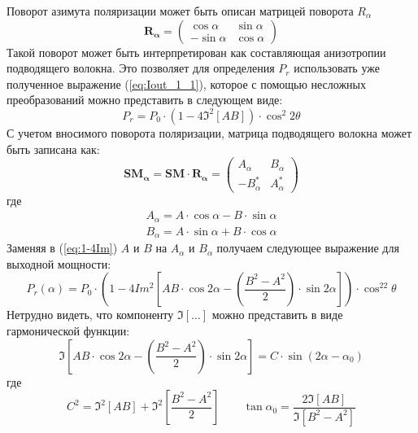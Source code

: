 \documentclass{article}
\begin{document}
Поворот азимута поляризации может быть описан матрицей поворота $R_\alpha$
\begin{equation}
	\label{eq:rotMatrix}
	\bm{R_\alpha} = 
	\begin{pmatrix}
		\cos\alpha & \sin\alpha \\
		-\sin\alpha & \cos\alpha
	\end{pmatrix}	
\end{equation} 
Такой поворот может быть интерпретирован как составляющая анизотропии подводящего волокна.
Это позволяет для определения $P_r$ использовать уже полученное выражение (\ref{eq:Iout_1_1}), которое с помощью несложных преобразований можно представить в следующем виде: 
\begin{equation}
    \label{eq:1-4Im}
    P_{r} = P_0 \cdot \left(1-4\Im^2[AB] \right) \cdot \cos^2 2 \theta
\end{equation}
С учетом вносимого поворота поляризации, матрица подводящего волокна может быть записана как:
\begin{equation}
    \bm{SM_\alpha} = \bm{SM}\cdot\bm{R_\alpha}= 
    \begin{pmatrix}
		A_\alpha & B_\alpha \\
		-B^*_\alpha & A^*_\alpha
    \end{pmatrix}	
\end{equation}
где
\begin{equation}
   \label{eq:Aa-Ba}
    \begin{aligned}
        A_\alpha = A\cdot\cos\alpha - B\cdot\sin\alpha \\
        B_\alpha = A\cdot\sin\alpha + B\cdot\cos\alpha
    \end{aligned}
\end{equation}
Заменяя в (\ref{eq:1-4Im}) $A$ и $B$ на $A_\alpha$ и $B_\alpha$ получаем следующее выражение для выходной мощности:
\begin{equation}
    \label{eq:Pr_our}
    P_r(\alpha)=P_0\cdot\left( 1-4Im^2\left[A B\cdot \cos2\alpha -\left( \frac{B^2-A^2}{2} \right)\cdot\sin2\alpha\right] \right)\cdot\cos^22\theta
\end{equation}
Нетрудно видеть, что компоненту $\Im[\ldots]$ можно представить в виде гармонической функции:
\begin{equation}
    \Im\left[A B\cdot \cos2\alpha -\left( \frac{B^2-A^2}{2} \right)\cdot\sin2\alpha\right] = C\cdot\sin(2\alpha-\alpha_0)
\end{equation}
где
\begin{equation}
    C^2=\Im^2[AB]+\Im^2\left[\frac{B^2-A^2}{2}\right] \qquad \tan\alpha_0=\frac{2\Im[AB]}{\Im[B^2-A^2]}
\end{equation}
\end{document}

